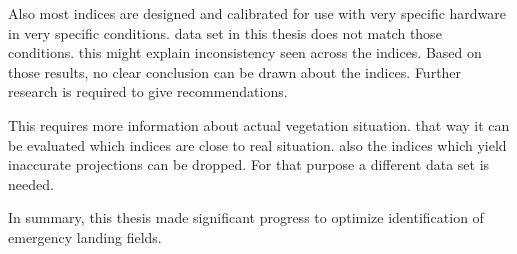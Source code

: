 {Also most indices are designed and calibrated for use with very specific hardware in very specific conditions. data set in this thesis does not match those conditions. this might explain inconsistency seen across the indices. Based on those results, no clear conclusion can be drawn about the indices. Further research is required to give recommendations. 

This requires more information about actual vegetation situation. that way it can be evaluated which indices are close to real situation. also the indices which yield inaccurate projections can be dropped. For that purpose a different data set is needed. 

In summary, this thesis made significant progress to optimize identification of emergency landing fields. 
}

\newpage